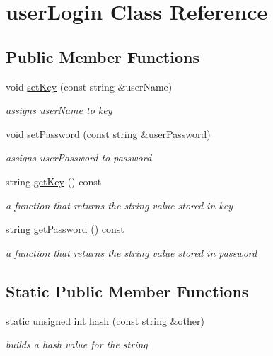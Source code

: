 \hypertarget{classuser_login}{}\section{user\+Login Class Reference}
\label{classuser_login}
\subsection*{Public Member Functions}
\begin{DoxyCompactItemize}
\item 
void \hyperlink{classuser_login_ae3163e77300eb7b421dd86c7ad5ddd29}{set\+Key} (const string \&user\+Name)
\begin{DoxyCompactList}\small\item\em assigns user\+Name to key \end{DoxyCompactList}\item 
void \hyperlink{classuser_login_aa68bad43546ce422a9dc890bc3076f9f}{set\+Password} (const string \&user\+Password)
\begin{DoxyCompactList}\small\item\em assigns user\+Password to password \end{DoxyCompactList}\item 
string \hyperlink{classuser_login_a878a46d63f52f3c8f42cef5397a0e5da}{get\+Key} () const 
\begin{DoxyCompactList}\small\item\em a function that returns the string value stored in key \end{DoxyCompactList}\item 
string \hyperlink{classuser_login_a989b6f6209179203230a27ca432cfcc8}{get\+Password} () const 
\begin{DoxyCompactList}\small\item\em a function that returns the string value stored in password \end{DoxyCompactList}\end{DoxyCompactItemize}
\subsection*{Static Public Member Functions}
\begin{DoxyCompactItemize}
\item 
static unsigned int \hyperlink{classuser_login_aa84ebf10310aa3a1ac6483e913bef20c}{hash} (const string \&other)
\begin{DoxyCompactList}\small\item\em builds a hash value for the string \end{DoxyCompactList}\end{DoxyCompactItemize}


